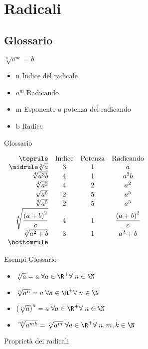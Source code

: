 \chapter{Radicali}
\label{Radicaliradici}
\section{Glossario}
\begin{table}[H]
\centering
$\sqrt[n]{a^m}=b$
\begin{itemize}
\item n Indice del radicale
\item $a^m$ Radicando
\item m Esponente o potenza del radicando
\item b Radice
\end{itemize}
\caption{Glossario}
\label{tab:RadicaliGlossario}
\end{table}
\begin{table}[H]
\centering
$
\begin{array}{rccc}
\toprule
 &\text{Indice} & \text{Potenza} & \text{Radicando} \\ 
 \midrule
 \sqrt[3]{a}& 3 &1  & a \\ 
 \sqrt[4]{a^3b}& 4 &1  & a^3b \\ 
 \sqrt[4]{a^2}& 4 &2  & a^2 \\
\sqrt{a^5}& 2 &5 & a^5 \\ 
\sqrt[2]{a^5}& 2 &5 & a^5 \\ 
\sqrt[4]{\dfrac{\left( a+b\right)^2 }{c}}& 4 &1 &\dfrac{\left( a+b\right)^2 }{c} \\
\sqrt[3]{a^2+b}& 3 &1 & a^2+b\\
\bottomrule	
\end{array}
$ 
\label{tab:esempiglossario}
\caption{Esempi Glossario}
\end{table}

\begin{table}[H]
\centering
\begin{itemize}
	\item $\sqrt[1]{a}=a\; \forall a\in\R^{+}\forall\; n\in\N$
	\item $\sqrt[n]{a^n}=a\; \forall a\in\R^{+}\forall\; n\in\N $
	\item $\left(\sqrt[n]{a}\right)^n=a\; \forall a\in\R^{+}\forall\; n\in\N $
	\item $\sqrt[nk]{a^{mk}}=\sqrt[n]{a^m}\;  \forall a\in\R^{+}\forall\; n,m,k\in\N$\label{Rad:invariantiva}
\end{itemize}
\label{tab:propRadicli}
\caption{Proprietà dei radicali}
\end{table}
